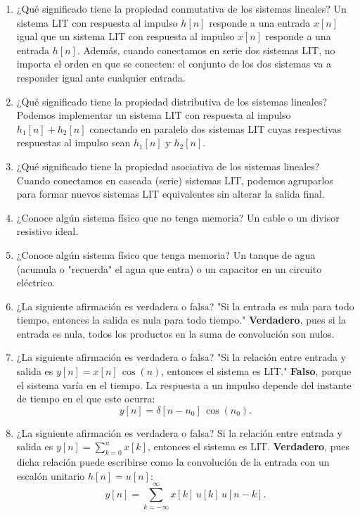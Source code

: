 \documentclass[11pt,a4paper,openany]{book}
\begin{document}
\begin{enumerate}
	\item ¿Qué significado tiene la propiedad conmutativa de los sistemas lineales?
	Un sistema LIT con respuesta al impulso $h[n]$ responde a una entrada $x[n]$ igual que un sistema LIT con respuesta al impulso $x[n]$ responde a una entrada $h[n]$. Además, cuando conectamos en serie dos sistemas LIT, no importa el orden en que se conecten: el conjunto de los dos sistemas va a responder igual ante cualquier entrada.
	
	\item ¿Qué significado tiene la propiedad distributiva de los sistemas lineales?
	Podemos implementar un sistema LIT con respuesta al impulso $h_{1}[n] + h_{2}[n]$ conectando en paralelo dos sistemas LIT cuyas respectivas respuestas al impulso sean $h_{1}[n]$ y $h_{2}[n]$.
	
	\item ¿Qué significado tiene la propiedad asociativa de los sistemas lineales?
	Cuando conectamos en cascada (serie) sistemas LIT, podemos agruparlos para formar nuevos sistemas LIT equivalentes sin alterar la salida final.
	
	\item ¿Conoce algún sistema físico que no tenga memoria?
	Un cable o un divisor resistivo ideal.
	
	\item ¿Conoce algún sistema físico que tenga memoria?
	Un tanque de agua (acumula o "recuerda" el agua que entra) o un capacitor en un circuito eléctrico.
	
	\item ¿La siguiente afirmación es verdadera o falsa? "Si la entrada es nula para todo tiempo, entonces la salida es nula para todo tiempo."
	\textbf{Verdadero}, pues si la entrada es nula, todos los productos en la suma de convolución son nulos.
	
	\item ¿La siguiente afirmación es verdadera o falsa? "Si la relación entre entrada y salida es $y[n] = x[n] \, \cos(n)$, entonces el sistema es LIT."
	\textbf{Falso}, porque el sistema varía en el tiempo. La respuesta a un impulso depende del instante de tiempo en el que este ocurra:
	\begin{equation}
		y[n] = \delta[n - n_{0}] \, \cos(n_{0}).
	\end{equation}
	
	\item ¿La siguiente afirmación es verdadera o falsa? Si la relación entre entrada y salida es $y[n] = \sum_{k=0}^{n} x[k]$, entonces el sistema es LIT.
	\textbf{Verdadero}, pues dicha relación puede escribirse como la convolución de la entrada con un escalón unitario $h[n] = u[n]$:
	\begin{equation}
		y[n] = \sum_{k=-\infty}^{\infty} x[k] \, u[k] \, u[n-k].
	\end{equation}
\end{enumerate}
	
\end{document}
